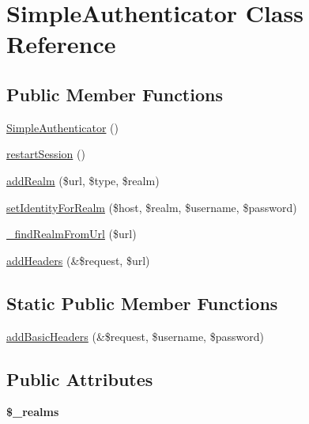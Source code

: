 \hypertarget{class_simple_authenticator}{
\section{SimpleAuthenticator Class Reference}
\label{class_simple_authenticator}
}
\subsection*{Public Member Functions}
\begin{DoxyCompactItemize}
\item 
\hyperlink{class_simple_authenticator_a19587b9af0878aaa151a8f08da17e758}{SimpleAuthenticator} ()
\item 
\hyperlink{class_simple_authenticator_a3607a43a51682171774b003bd9cad14e}{restartSession} ()
\item 
\hyperlink{class_simple_authenticator_aff0493eebbba01ffac2f25e5a986fa9d}{addRealm} (\$url, \$type, \$realm)
\item 
\hyperlink{class_simple_authenticator_a557e4ed50c3623b0fc777dbf6723d5d3}{setIdentityForRealm} (\$host, \$realm, \$username, \$password)
\item 
\hyperlink{class_simple_authenticator_a16cd31f6a2794295e7e3a9d9cf70eec2}{\_\-findRealmFromUrl} (\$url)
\item 
\hyperlink{class_simple_authenticator_a452ef4613fe6b053cf086d4e31dfefb0}{addHeaders} (\&\$request, \$url)
\end{DoxyCompactItemize}
\subsection*{Static Public Member Functions}
\begin{DoxyCompactItemize}
\item 
\hyperlink{class_simple_authenticator_a8ab949ba2187ae43c740b3b2001ae32d}{addBasicHeaders} (\&\$request, \$username, \$password)
\end{DoxyCompactItemize}
\subsection*{Public Attributes}
\begin{DoxyCompactItemize}
\item 
\hypertarget{class_simple_authenticator_a4bd75df03670130c65cff8874bd1aaf2}{
{\bfseries \$\_\-realms}}
\label{class_simple_authenticator_a4bd75df03670130c65cff8874bd1aaf2}

\end{DoxyCompactItemize}


